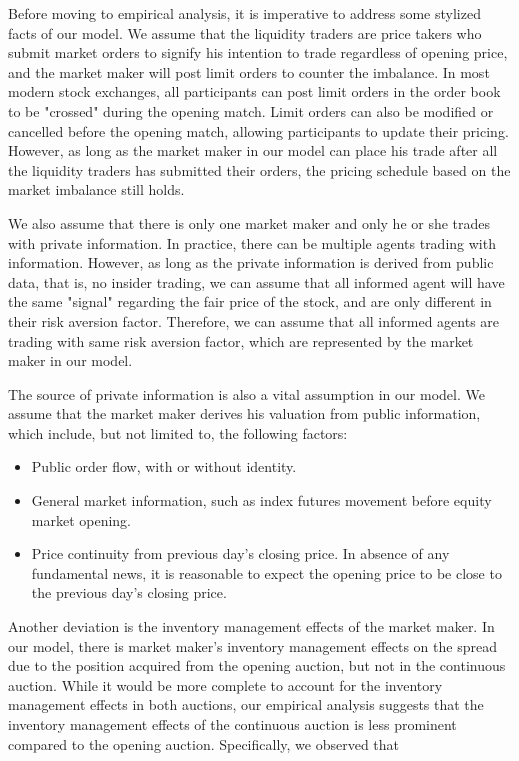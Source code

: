 \documentclass{article}
\begin{document}
Before moving to empirical analysis, it is imperative to address some stylized facts of our model. We assume that the liquidity traders are price takers who submit market orders to signify his intention to trade regardless of opening price, and the market maker will post limit orders to counter the imbalance. In most modern stock exchanges, all participants can post limit orders in the order book to be "crossed" during the opening match. Limit orders can also be modified or cancelled before the opening match, allowing participants to update their pricing. However, as long as the market maker in our model can place his trade after all the liquidity traders has submitted their orders, the pricing schedule based on the market imbalance still holds.

We also assume that there is only one market maker and only he or she trades with private information. In practice, there can be multiple agents trading with information. However, as long as the private information is derived from public data, that is, no insider trading, we can assume that all informed agent will have the same "signal" regarding the fair price of the stock, and are only different in their risk aversion factor. Therefore, we can assume that all informed agents are trading with same risk aversion factor, which are represented by the market maker in our model.

The source of private information is also a vital assumption in our model. We assume that the market maker derives his valuation from public information, which include, but not limited to, the following factors:

\begin{itemize}
  \item Public order flow, with or without identity.
  \item General market information, such as index futures movement before equity market opening.
  \item Price continuity from previous day's closing price. In absence of any fundamental news, it is reasonable to expect the opening price to be close to the previous day's closing price.
\end{itemize}

Another deviation is the inventory management effects of the market maker. In our model, there is market maker's inventory management effects on the spread due to the position acquired from the opening auction, but not in the continuous auction. While it would be more complete to account for the inventory management effects in both auctions, our empirical analysis suggests that the inventory management effects of the continuous auction is less prominent compared to the opening auction. Specifically, we observed that
\end{document}
